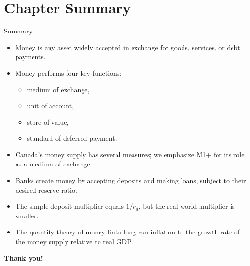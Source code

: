 \documentclass[aspectratio=169]{beamer}
\begin{document}
\section*{Chapter Summary}

\begin{frame}{Summary}
\transfade
\begin{itemize}[<+->]
  \item Money is any asset widely accepted in exchange for goods, services, or debt payments.
  \item Money performs four key functions:
  \begin{itemize}[<+->]
    \item medium of exchange,
    \item unit of account,
    \item store of value,
    \item standard of deferred payment.
  \end{itemize}
  \item Canada’s money supply has several measures; we emphasize M1+ for its role as a medium of exchange.
  \item Banks create money by accepting deposits and making loans, subject to their desired reserve ratio.
  \item The simple deposit multiplier equals \(1 / r_{d}\), but the real-world multiplier is smaller.
  \item The quantity theory of money links long-run inflation to the growth rate of the money supply relative to real GDP.
\end{itemize}
\end{frame}

\begin{frame}
\centering
\Huge \textbf{Thank you!}
\end{frame}
\end{document}
